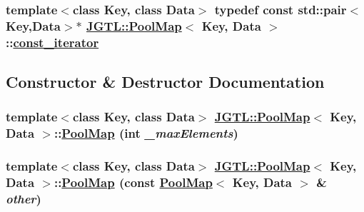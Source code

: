 \hypertarget{class_j_g_t_l_1_1_pool_map_123acfa775472141cec2bb3991c93d21}{
\subsubsection[const\_\-iterator]{\setlength{\rightskip}{0pt plus 5cm}template$<$class Key, class Data$>$ typedef const std::pair$<$Key,Data$>$$\ast$ \hyperlink{class_j_g_t_l_1_1_pool_map}{JGTL::Pool\-Map}$<$ Key, Data $>$::\hyperlink{class_j_g_t_l_1_1_pool_map_123acfa775472141cec2bb3991c93d21}{const\_\-iterator}}}
\label{class_j_g_t_l_1_1_pool_map_123acfa775472141cec2bb3991c93d21}




\subsection{Constructor \& Destructor Documentation}
\hypertarget{class_j_g_t_l_1_1_pool_map_8f488dfbc3383bc75157b60640b33ade}{
\subsubsection[PoolMap]{\setlength{\rightskip}{0pt plus 5cm}template$<$class Key, class Data$>$ \hyperlink{class_j_g_t_l_1_1_pool_map}{JGTL::Pool\-Map}$<$ Key, Data $>$::\hyperlink{class_j_g_t_l_1_1_pool_map}{Pool\-Map} (int {\em \_\-max\-Elements})}}
\label{class_j_g_t_l_1_1_pool_map_8f488dfbc3383bc75157b60640b33ade}


\hypertarget{class_j_g_t_l_1_1_pool_map_a276af8c63cb02ed4d2de28bf36cd7cc}{
\subsubsection[PoolMap]{\setlength{\rightskip}{0pt plus 5cm}template$<$class Key, class Data$>$ \hyperlink{class_j_g_t_l_1_1_pool_map}{JGTL::Pool\-Map}$<$ Key, Data $>$::\hyperlink{class_j_g_t_l_1_1_pool_map}{Pool\-Map} (const \hyperlink{class_j_g_t_l_1_1_pool_map}{Pool\-Map}$<$ Key, Data $>$ \& {\em other})}}
\label{class_j_g_t_l_1_1_pool_map_a276af8c63cb02ed4d2de28bf36cd7cc}


